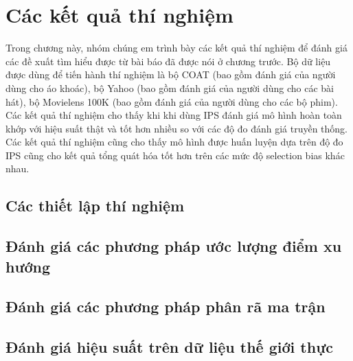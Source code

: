 \chapter{Các kết quả thí nghiệm}
\label{Chapter4}

Trong chương này, nhóm chúng em trình bày các kết quả thí nghiệm để đánh giá các đề xuất tìm hiểu được từ bài báo đã được nói ở chương trước. Bộ dữ liệu được dùng để tiến hành thí nghiệm là bộ COAT (bao gồm đánh giá của người dùng cho áo khoác), bộ Yahoo (bao gồm đánh giá của người dùng cho các bài hát), bộ Movielens 100K (bao gồm đánh giá của người dùng cho các bộ phim). Các kết quả thí nghiệm cho thấy khi khi dùng IPS đánh giá mô hình hoàn toàn khớp với hiệu suất thật và tốt hơn nhiều so với các độ đo đánh giá truyền thống. Các kết quả thí nghiệm cũng cho thấy mô hình được huấn luyện dựa trên độ đo IPS cũng cho kết quả tổng quát hóa tốt hơn trên các mức độ selection bias khác nhau.

\section{Các thiết lập thí nghiệm}
\section{Đánh giá các phương pháp ước lượng điểm xu hướng}
\section{Đánh giá các phương pháp phân rã ma trận}
\section{Đánh giá hiệu suất trên dữ liệu thế giới thực}
